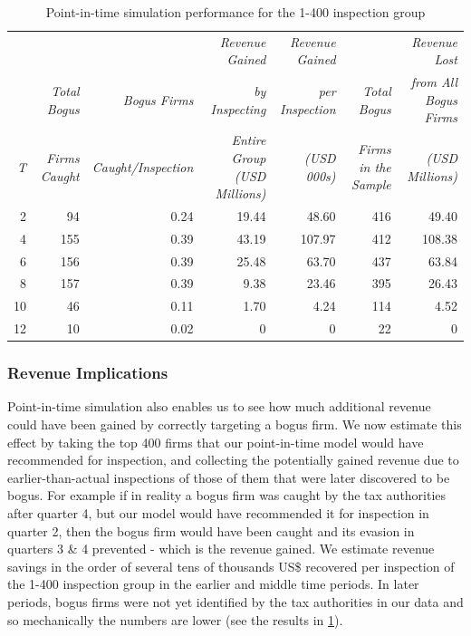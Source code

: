 \begin{table}
  \begin{tabular}{rrrrrrr}
  	\toprule
	  &&& {\small \textit{Revenue Gained}}& {\small \textit{Revenue Gained}}&&{\small \textit{Revenue Lost}} \\
    & {\small \textit{Total Bogus}} &{\small \textit{Bogus Firms}}&{\small \textit{by Inspecting}}&{\small \textit{per Inspection}}&{\small \textit{Total Bogus}}&{\small \textit{from All Bogus Firms}}\\
  {\small \textit{T}}&{\small \textit{Firms Caught}}& {\small \textit{Caught/Inspection}}&{\small \textit{Entire Group (USD Millions)}}&{\small \textit{(USD 000s)}} &{\small \textit{Firms in the Sample}}&{\small \textit{(USD Millions)}} \\
    \midrule
    2 &  94&0.24 &19.44&48.60&416&49.40\\
    4 & 155&0.39  &43.19&107.97&412&108.38\\
    6 & 156&0.39  &25.48&63.70&437&63.84\\
    8 & 157&0.39  & 9.38&23.46&395&26.43\\
   10 &  46&0.11  &1.70 & 4.24&114&4.52\\
   12 &  10&0.02  &      0&   0&22&0\\
    \bottomrule
  \end{tabular}
  \caption{Point-in-time simulation performance for the 1-400 inspection group}
  \label{tab:PointInTimeResults}
\end{table}

\subsubsection{Revenue Implications}
\label{subsec:revenue-implications}
Point-in-time simulation also enables us to see how much additional revenue could have been gained by correctly targeting a bogus firm. We now estimate this effect by taking the top 400 firms that our point-in-time model would have recommended for inspection, and collecting the potentially gained revenue due to earlier-than-actual inspections of those of them that were later discovered to be bogus. For example if in reality a bogus firm was caught by the tax authorities after quarter 4, but our model  would have recommended it for inspection in quarter 2, then the bogus firm would have been caught and its evasion in quarters 3 \& 4 prevented - which is the revenue gained. We estimate revenue savings in the order of several tens of thousands US\$ recovered per inspection of the 1-400 inspection group in the earlier and middle time periods. In later periods, bogus firms were not yet identified by the tax authorities in our data and so mechanically the numbers are lower (see the results in \cref{tab:PointInTimeResults}). 

